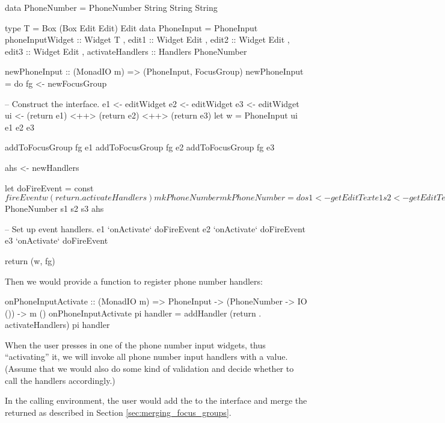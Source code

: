 \begin{haskellcode}
 data PhoneNumber = PhoneNumber String String String

 type T = Box (Box Edit Edit) Edit
 data PhoneInput =
   PhoneInput { phoneInputWidget :: Widget T
              , edit1 :: Widget Edit
              , edit2 :: Widget Edit
              , edit3 :: Widget Edit
              , activateHandlers :: Handlers PhoneNumber
              }

 newPhoneInput :: (MonadIO m) => (PhoneInput, FocusGroup)
 newPhoneInput = do
   fg <- newFocusGroup

   -- Construct the interface.
   e1 <- editWidget
   e2 <- editWidget
   e3 <- editWidget
   ui <- (return e1) <++> (return e2) <++> (return e3)
   let w = PhoneInput ui e1 e2 e3

   addToFocusGroup fg e1
   addToFocusGroup fg e2
   addToFocusGroup fg e3

   ahs <- newHandlers

   let doFireEvent = const $
         fireEvent w (return . activateHandlers) mkPhoneNumber

       mkPhoneNumber = do
         s1 <- getEditText e1
         s2 <- getEditText e2
         s3 <- getEditText e3
         return $ PhoneNumber s1 s2 s3 ahs

   -- Set up event handlers.
   e1 `onActivate` doFireEvent
   e2 `onActivate` doFireEvent
   e3 `onActivate` doFireEvent

   return (w, fg)
\end{haskellcode}

Then we would provide a function to register phone number handlers:

\begin{haskellcode}
 onPhoneInputActivate :: (MonadIO m) => PhoneInput
                      -> (PhoneNumber -> IO ()) -> m ()
 onPhoneInputActivate pi handler =
   addHandler (return . activateHandlers) pi handler
\end{haskellcode}

When the user presses  in one of the phone number input
widgets, thus ``activating'' it, we will invoke all phone number input
handlers with a  value.  (Assume that we would also do
some kind of validation and decide whether to call the handlers
accordingly.)

In the calling environment, the user would add the
 to the interface and merge the returned
 as described in Section
\ref{sec:merging_focus_groups}.

